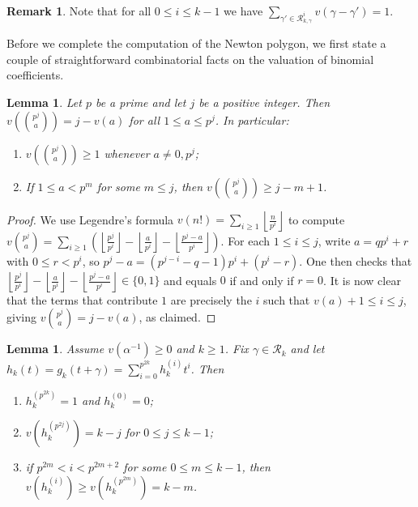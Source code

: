 \documentclass{amsart}
\newtheorem{lemma}[theorem]{Lemma}
\theoremstyle{definition}
\newtheorem{remark}[theorem]{Remark}
\numberwithin{theorem}{section}
\numberwithin{equation}{section}
\begin{document}
\begin{remark}\label{rmk: sum of roots in a group}
    Note that for all $0 \leq i \leq k-1$ we have $\sum_{\gamma' \in \mathcal{R}_{k, \gamma}^i} v(\gamma-\gamma') = 1$.
\end{remark}

Before we complete the computation of the Newton polygon, we first state a couple of straightforward combinatorial facts on the valuation of binomial coefficients.

\begin{lemma}\label{lemma: binomial valuation}
Let $p$ be a prime and let $j$ be a positive integer.  Then $v\left( \binom{p^j}{a} \right) = j-v(a)$ for all $1 \leq a \leq p^j$. In particular:
\begin{enumerate}
    \item $v\left( \binom{p^j}{a} \right) \ge 1$ whenever $a \ne 0, p^j$;
    \item If $1 \leq a< p^m$ for some $m \leq j$, then $v\left( \binom{p^j}{a} \right) \geq j-m+1$.
\end{enumerate}
\end{lemma}

\begin{proof}
We use Legendre’s formula $v(n!)=\sum_{i\ge1}\left\lfloor \frac{n}{p^i}\right\rfloor$ to compute $v\binom{p^j}{a}
= \sum_{i \geq 1} \left( \left\lfloor \frac{p^j}{p^i}\right\rfloor
- \left\lfloor \frac{a}{p^i}\right\rfloor
- \left\lfloor \frac{p^j-a}{p^i}\right\rfloor \right)$. For each $1 \leq i \leq j$, write $a=qp^i +r$ with $0 \leq r < p^i$, so $p^j-a=(p^{j-i}-q-1)p^i+(p^i-r)$. One then checks that $\left\lfloor \frac{p^j}{p^i}\right\rfloor
- \left\lfloor \frac{a}{p^i}\right\rfloor
- \left\lfloor \frac{p^j-a}{p^i}\right\rfloor \in \{0,1\}$ and equals $0$ if and only if $r=0$. It is now clear that the terms that contribute $1$ are precisely the $i$ such that $v(a) +1 \leq i \leq j$, giving $v\binom{p^j}{a}
= j-v(a)$, as claimed.
\end{proof}




\begin{lemma}\label{lemma: shifted Newton polygon}
Assume $v(\alpha^{-1}) \geq 0$ and $k\geq 1$. Fix $\gamma \in \mathcal{R}_k$ and let $h_k(t) = g_k(t+\gamma) = \sum_{i=0}^{p^{2k}} h_k^{(i)} t^i$. Then
\begin{enumerate}
    \item $h_k^{(p^{2k})}=1$ and $h_k^{(0)}=0$;
    \item $v(h_k^{(p^{2j})})=k-j$ for $0 \leq j \leq k-1$;
    \item if $p^{2m} < i < p^{2m+2}$ for some $0 \leq m \leq k-1$, then $v(h_k^{(i)}) \geq v(h_k^{(p^{2m})})=k-m$.
\end{enumerate}
\end{lemma}
\end{document}
